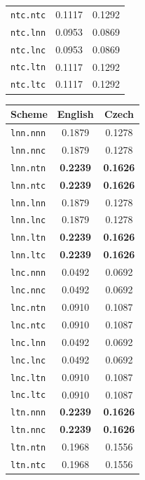 \documentclass[a4paper, 12pt]{article}
\begin{document}
\begin{table}[H]
\begin{tabular}[t]{p{3cm}cc}
        \texttt{ntc.ntc} & 0.1117 & 0.1292 \\
        \texttt{ntc.lnn} & 0.0953 & 0.0869 \\
        \texttt{ntc.lnc} & 0.0953 & 0.0869 \\
        \texttt{ntc.ltn} & 0.1117 & 0.1292 \\
        \texttt{ntc.ltc} & 0.1117 & 0.1292 \\
        \hline
    \end{tabular}%
    \hfill%
    \begin{tabular}[t]{p{3cm}cc} 
        \hline
        \textbf{Scheme} & \textbf{English} & \textbf{Czech} \\ 
        \hline
        \texttt{lnn.nnn} & 0.1879          & 0.1278 \\
        \texttt{lnn.nnc} & 0.1879          & 0.1278 \\
        \texttt{lnn.ntn} & \textbf{0.2239} & \textbf{0.1626} \\
        \texttt{lnn.ntc} & \textbf{0.2239} & \textbf{0.1626} \\
        \texttt{lnn.lnn} & 0.1879          & 0.1278 \\
        \texttt{lnn.lnc} & 0.1879          & 0.1278 \\
        \texttt{lnn.ltn} & \textbf{0.2239} & \textbf{0.1626} \\
        \texttt{lnn.ltc} & \textbf{0.2239} & \textbf{0.1626} \\
        \texttt{lnc.nnn} & 0.0492          & 0.0692 \\
        \texttt{lnc.nnc} & 0.0492          & 0.0692 \\
        \texttt{lnc.ntn} & 0.0910          & 0.1087 \\
        \texttt{lnc.ntc} & 0.0910          & 0.1087 \\
        \texttt{lnc.lnn} & 0.0492          & 0.0692 \\
        \texttt{lnc.lnc} & 0.0492          & 0.0692 \\
        \texttt{lnc.ltn} & 0.0910          & 0.1087 \\
        \texttt{lnc.ltc} & 0.0910          & 0.1087 \\
        \texttt{ltn.nnn} & \textbf{0.2239} & \textbf{0.1626} \\
        \texttt{ltn.nnc} & \textbf{0.2239} & \textbf{0.1626} \\
        \texttt{ltn.ntn} & 0.1968          & 0.1556 \\
        \texttt{ltn.ntc} & 0.1968          & 0.1556 \\

\end{tabular}
\end{table}
\end{document}
